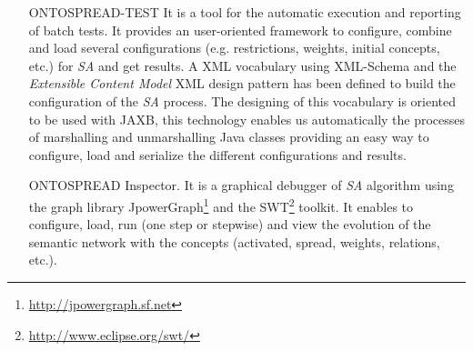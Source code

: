 \begin{itemize}
 \item [ONTOSPREAD-TEST] It is a tool for the automatic execution and reporting
of batch tests. It provides an user-oriented framework to configure, combine and load several
configurations (e.g. restrictions, weights, initial concepts, etc.) for \textit{SA} and get results. A XML
vocabulary using XML-Schema and the \textit{Extensible Content Model} XML design
pattern has been defined to build the configuration of the \textit{SA} process.
 The designing of this vocabulary is oriented to be used with JAXB, this technology enables us 
automatically the processes of marshalling and unmarshalling Java classes providing an easy way to configure, 
load and serialize the different configurations and results. 

\item [ONTOSPREAD Inspector.] It is a graphical debugger of \textit{SA} algorithm 
using the graph library JpowerGraph\footnote{\url{http://jpowergraph.sf.net}} and
the SWT\footnote{\url{http://www.eclipse.org/swt/}} toolkit. It enables to configure, load, 
 run (one step or stepwise) and view the evolution of the semantic network 
 with the concepts (activated, spread, weights, relations, etc.).
\end{itemize}

